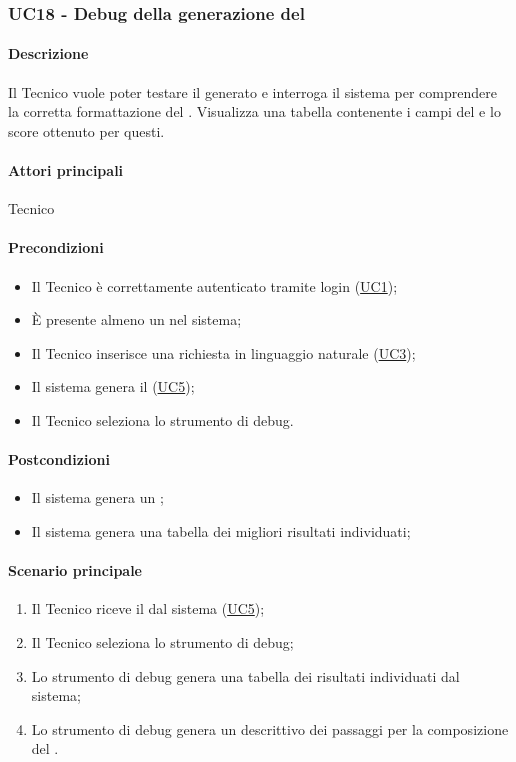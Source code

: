 \subsubsection{UC18 - Debug della generazione del }\label{UC18}

\paragraph*{Descrizione}
Il Tecnico vuole poter testare il  generato e interroga il sistema per comprendere la corretta formattazione del . Visualizza una tabella contenente i campi del  e lo score ottenuto per questi.

\paragraph*{Attori principali}
Tecnico

\paragraph*{Precondizioni}
\begin{itemize}
  \item Il Tecnico è correttamente autenticato tramite login (\hyperref[UC1]{UC1});
  \item È presente almeno un  nel sistema;
  \item Il Tecnico inserisce una richiesta in linguaggio naturale (\hyperref[UC3]{UC3});
  \item Il sistema genera il  (\hyperref[UC5]{UC5});
  \item Il Tecnico seleziona lo strumento di debug.
\end{itemize}

\paragraph*{Postcondizioni}
\begin{itemize}
  \item Il sistema genera un ;
  \item Il sistema genera una tabella dei migliori risultati individuati;
\end{itemize}

\paragraph*{Scenario principale}
\begin{enumerate}
  \item Il Tecnico riceve il  dal sistema (\hyperref[UC5]{UC5});
  \item Il Tecnico seleziona lo strumento di debug;
  \item Lo strumento di debug genera una tabella dei risultati individuati dal sistema; 
  \item Lo strumento di debug genera un  descrittivo dei passaggi per la composizione del .  
\end{enumerate}

